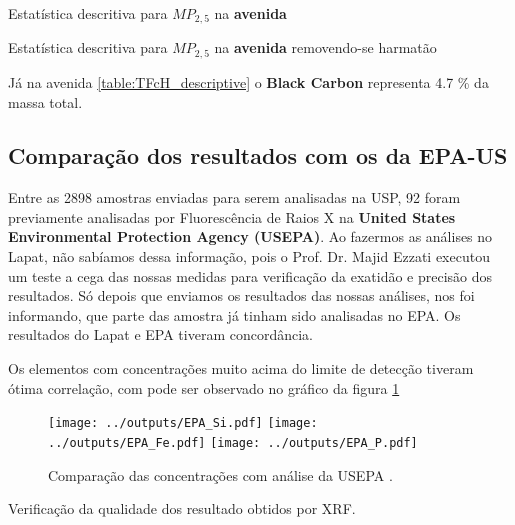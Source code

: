 \begin{table}[H]
  \centering
    
  \caption{Estatística descritiva para $MP_{2,5}$ na \textbf{avenida}
            \label{table:TFcH_descriptive}}
\end{table}

\begin{table}[H]
  \centering
    
  \caption{Estatística descritiva para $MP_{2,5}$ na \textbf{avenida}
           removendo-se harmatão \label{table:TFsH_descriptive}}
\end{table}


Já na avenida \ref{table:TFcH_descriptive} o \textbf{Black Carbon} 
representa 4.7 \% da massa total.

%    

\subsection{Comparação dos resultados com os da EPA-US}

Entre as 2898 amostras enviadas para serem analisadas na USP, 92 foram previamente 
analisadas por Fluorescência de Raios X na \textbf{United States Environmental 
Protection Agency (USEPA)}. Ao fazermos as análises no Lapat, não sabíamos
dessa informação, pois o Prof. Dr. Majid Ezzati executou um teste a cega das 
nossas medidas para verificação da exatidão e precisão dos resultados. 
Só depois que enviamos os resultados das nossas análises, nos foi informando, 
que parte das amostra já tinham sido analisadas no EPA. Os resultados do Lapat
e EPA tiveram concordância. 

Os elementos com concentrações muito acima do limite de detecção tiveram ótima
correlação, com pode ser observado no gráfico da figura \ref{fig:epa} 

\begin{figure}[H]
  \centering
    \texttt{[image: ../outputs/EPA\_Si.pdf]}
    \texttt{[image: ../outputs/EPA\_Fe.pdf]}
    \texttt{[image: ../outputs/EPA\_P.pdf]}
  \caption{Comparação das concentrações com análise da USEPA \label{fig:epa}.}
\end{figure}

Verificação da qualidade dos resultado obtidos por XRF.

